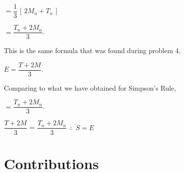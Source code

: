 \documentclass[letterpaper,12pt]{article}
\theoremstyle{definition}
\begin{document}
\vskip 16pt

$=\dfrac{1}{3}\, [\, 2M_n+T_n\, ]$

\vskip 16pt

$=\dfrac{T_n+2M_n}{3}$.

\vspace{1cm}

This is the same formula that was found during problem 4,

\vspace{0.5cm}

\begin{center}
    \hspace{-7mm}$E=\dfrac{T+2M}{3}$.
\end{center}

\vspace{0.5cm}

Comparing to what we have obtained for Simpson's Rule,

\vspace{0.5cm}

\begin{center}
   $=\dfrac{T_n+2M_n}{3}$.
\end{center}

\vskip 16pt

\begin{center}
    \hspace{-18mm}$\dfrac{T+2M}{3}$ = $\dfrac{T_n+2M_n}{3}$
    \vskip 16pt
    \hspace{-27mm}$\therefore\ \ S=E$
\end{center}

\pagebreak

\section*{Contributions}

\begin{large}

\end{large}
\end{document}
